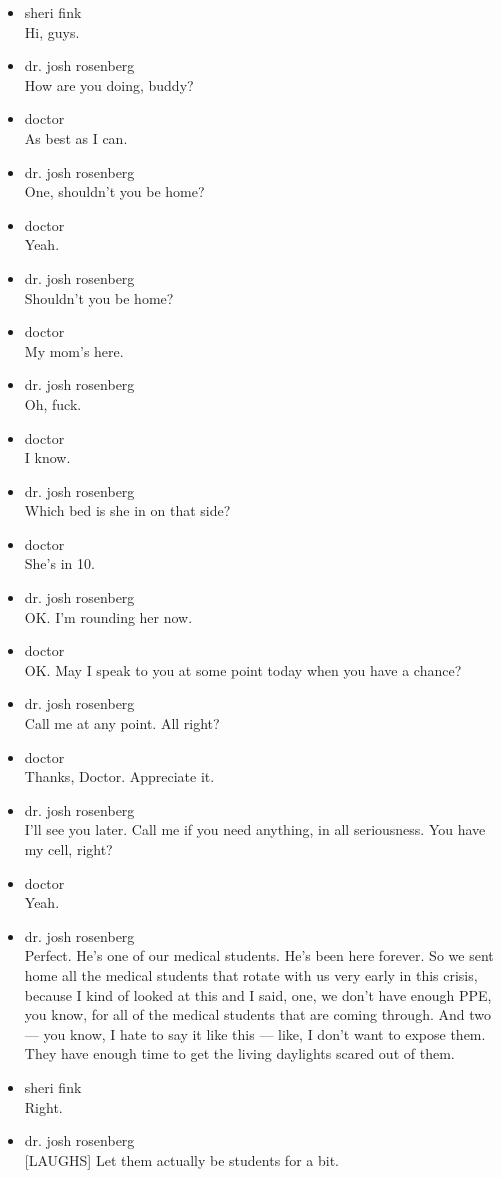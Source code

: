\begin{itemize}
\item
  sheri fink\\
  Hi, guys.
\item
  dr. josh rosenberg\\
  How are you doing, buddy?
\item
  doctor\\
  As best as I can.
\item
  dr. josh rosenberg\\
  One, shouldn't you be home?
\item
  doctor\\
  Yeah.
\item
  dr. josh rosenberg\\
  Shouldn't you be home?
\item
  doctor\\
  My mom's here.
\item
  dr. josh rosenberg\\
  Oh, fuck.
\item
  doctor\\
  I know.
\item
  dr. josh rosenberg\\
  Which bed is she in on that side?
\item
  doctor\\
  She's in 10.
\item
  dr. josh rosenberg\\
  OK. I'm rounding her now.
\item
  doctor\\
  OK. May I speak to you at some point today when you have a chance?
\item
  dr. josh rosenberg\\
  Call me at any point. All right?
\item
  doctor\\
  Thanks, Doctor. Appreciate it.
\item
  dr. josh rosenberg\\
  I'll see you later. Call me if you need anything, in all seriousness.
  You have my cell, right?
\item
  doctor\\
  Yeah.
\item
  dr. josh rosenberg\\
  Perfect. He's one of our medical students. He's been here forever. So
  we sent home all the medical students that rotate with us very early
  in this crisis, because I kind of looked at this and I said, one, we
  don't have enough PPE, you know, for all of the medical students that
  are coming through. And two --- you know, I hate to say it like this
  --- like, I don't want to expose them. They have enough time to get
  the living daylights scared out of them.
\item
  sheri fink\\
  Right.
\item
  dr. josh rosenberg\\
  {[}LAUGHS{]} Let them actually be students for a bit.
\end{itemize}

